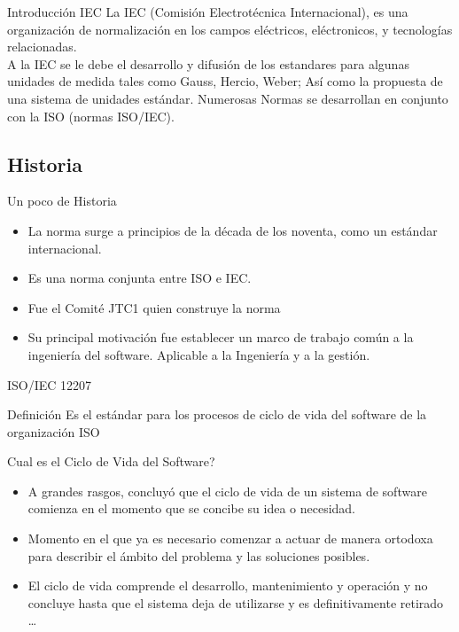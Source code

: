 \documentclass{beamer}
\begin{document}
			\begin{frame}{Introducción IEC}
				La IEC (Comisión Electrotécnica Internacional), es una organización de normalización en los campos eléctricos, eléctronicos, y tecnologías relacionadas.\\ \smallskip
				A la IEC se le debe el desarrollo y difusión de los estandares para algunas unidades de medida tales como Gauss, Hercio, Weber; Así como la propuesta de una sistema de unidades estándar. Numerosas Normas se desarrollan en conjunto con la ISO (normas ISO/IEC).
			\end{frame}
			
			\subsection{Historia}
				\begin{frame}{Un poco de Historia}
					\begin{itemize}
						\item La norma surge a principios de la década de los noventa, como un estándar internacional.
						\item Es una norma conjunta entre ISO e IEC.
						\item Fue el Comité JTC1 quien construye la norma
						\item Su principal motivación fue establecer un marco de trabajo común a la ingeniería del software. Aplicable a la Ingeniería y a la gestión.
					\end{itemize}
				\end{frame}
				
				\begin{frame}{ISO/IEC 12207}
					\begin{block}{Definición}
						Es el estándar para los procesos de ciclo de vida del software de la organización ISO
					\end{block}
				\end{frame}
				
				\begin{frame}
				\begin{center}
					\begin{center}
						{\huge Cual es el Ciclo de Vida del Software?}
					\end{center}
					
					\begin{itemize}
					\pause
						\item A grandes rasgos, concluyó que el ciclo de vida de un sistema de software comienza en el momento que se concibe su idea o necesidad.\pause
						\item Momento en el que ya es necesario comenzar a actuar de manera ortodoxa para describir el ámbito del problema y las soluciones posibles.\pause
						\item El ciclo de vida comprende el desarrollo, mantenimiento y operación y no concluye hasta que el sistema deja de utilizarse y es definitivamente retirado \ldots
					\end{itemize}
				\end{center}
			\end{frame}
			
\end{document}
